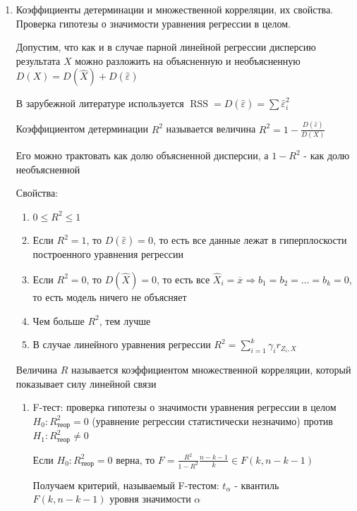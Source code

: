 \documentclass[12pt]{article}
\begin{document}
\begin{enumerate}
    \item Коэффициенты детерминации и множественной корреляции, их свойства. Проверка гипотезы о значимости уравнения регрессии в целом.

    Допустим, что как и в случае парной линейной регрессии дисперсию результата $X$ можно разложить на объясненную и необъясненную $D(X) = D(\hat X) + D(\hat \varepsilon)$

    \Nota В зарубежной литературе используется $\operatorname{RSS} = D(\hat \varepsilon) = \sum \hat \varepsilon_i^2$

    \Def Коэффициентом детерминации $R^2$ называется величина $R^2 = 1 - \frac{D(\hat \varepsilon)}{D(X)}$

    Его можно трактовать как долю объясненной дисперсии, а $1 - R^2$ - как долю необъясненной

    Свойства:

    \begin{enumerate}
        \item $0 \leq R^2 \leq 1$
        \item Если $R^2 = 1$, то $D(\hat \varepsilon) = 0$, то есть все данные лежат в гиперплоскости построенного уравнения регрессии
        \item Если $R^2 = 0$, то $D(\hat X) = 0$, то есть все $\hat X_i = \overline{x} \Longrightarrow b_1 = b_2 = \dots = b_k = 0$, то есть модель ничего не объясняет
        \item Чем больше $R^2$, тем лучше
        \item В случае линейного уравнения регрессии $R^2 = \sum_{i = 1}^k \gamma_i r_{Z_i, X}$
    \end{enumerate}

    \Def Величина $R$ называется коэффициентом множественной корреляции, который показывает силу линейной связи

    \begin{enumerate}[label*=\asbuk*) ]
        \item F-тест: проверка гипотезы о значимости уравнения регрессии в целом 
        $H_0 : R^2_\text{теор} = 0 $ (уравнение регрессии статистически незначимо) против $H_1 : R^2_\text{теор} \neq 0$

        \begin{MyTheorem}
            \Ths Если $H_0 : R^2_\text{теор} = 0$ верна, то $F = \frac{R^2}{1 - R^2} \frac{n - k - 1}{k} \in F(k, n - k - 1)$
        \end{MyTheorem}

        Получаем критерий, называемый F-тестом: $t_\alpha$ - квантиль $F(k, n - k - 1)$ уровня значимости $\alpha$


\end{enumerate}
\end{enumerate}
\end{document}
